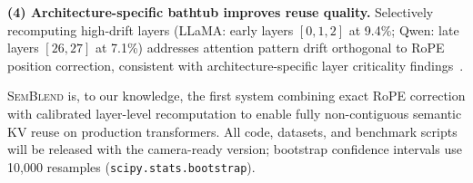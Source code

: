\documentclass[10pt,twocolumn]{article}
\newcommand{\semblend}{\textsc{SemBlend}\xspace}
\begin{document}
\textbf{(4) Architecture-specific bathtub improves reuse quality.}
Selectively recomputing high-drift layers (LLaMA: early layers $[0,1,2]$
at 9.4\%; Qwen: late layers $[26,27]$ at 7.1\%) addresses attention
pattern drift orthogonal to RoPE position correction, consistent with
architecture-specific layer criticality findings~\cite{kvphysics,droidspeak}.

\semblend is, to our knowledge, the first system combining exact RoPE
correction with calibrated layer-level recomputation to enable fully
non-contiguous semantic KV reuse on production transformers.
All code, datasets, and benchmark scripts will be released with the
camera-ready version; bootstrap confidence intervals use 10,000
resamples (\texttt{scipy.stats.bootstrap}).

\end{document}
